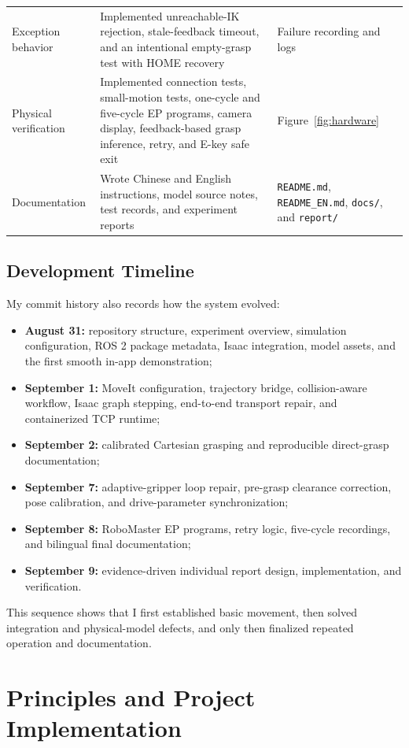 \documentclass[UTF8,zihao=-4,scheme=chinese,fontset=none]{ctexart}
\begin{document}
\begin{longtable}{p{2.9cm}p{7.1cm}p{2.9cm}}
Exception behavior & Implemented unreachable-IK rejection, stale-feedback timeout, and an intentional empty-grasp test with HOME recovery & Failure recording and logs\\
Physical verification & Implemented connection tests, small-motion tests, one-cycle and five-cycle EP programs, camera display, feedback-based grasp inference, retry, and E-key safe exit & Figure~\ref{fig:hardware}\\
Documentation & Wrote Chinese and English instructions, model source notes, test records, and experiment reports & \texttt{README.md}, \texttt{README\_EN.md}, \texttt{docs/}, and \texttt{report/}\\
\bottomrule
\end{longtable}
\endgroup

\subsection{Development Timeline}

My commit history also records how the system evolved:
\begin{itemize}
\item \textbf{August 31:} repository structure, experiment overview, simulation configuration, ROS 2 package metadata, Isaac integration, model assets, and the first smooth in-app demonstration;
\item \textbf{September 1:} MoveIt configuration, trajectory bridge, collision-aware workflow, Isaac graph stepping, end-to-end transport repair, and containerized TCP runtime;
\item \textbf{September 2:} calibrated Cartesian grasping and reproducible direct-grasp documentation;
\item \textbf{September 7:} adaptive-gripper loop repair, pre-grasp clearance correction, pose calibration, and drive-parameter synchronization;
\item \textbf{September 8:} RoboMaster EP programs, retry logic, five-cycle recordings, and bilingual final documentation;
\item \textbf{September 9:} evidence-driven individual report design, implementation, and verification.
\end{itemize}
This sequence shows that I first established basic movement, then solved integration and physical-model defects, and only then finalized repeated operation and documentation.

\section{Principles and Project Implementation}
\end{document}
